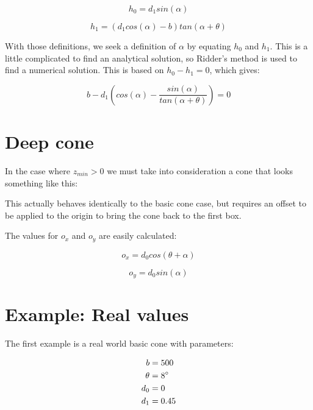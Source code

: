 \documentclass[12pt]{article}
\begin{document}
\begin{equation}
h_0 = d_1 sin(\alpha)
\end{equation}

\begin{equation}
h_1 = \left( d_1 cos(\alpha) - b \right) tan(\alpha + \theta)
\end{equation}

With those definitions, we seek a definition of $\alpha$ by equating
$h_0$ and $h_1$. This is a little complicated to find an analytical
solution, so Ridder's method is used to find a numerical solution. This
is based on $h_0 - h_1 = 0$, which gives:

\begin{equation}
b - d_1 \left( cos(\alpha) - \frac{sin(\alpha)}{tan(\alpha + \theta)} \right) = 0
\end{equation}

\section{Deep cone}

In the case where $z_{min} > 0$ we must take into consideration a cone that
looks something like this:

\resizebox{\textwidth}{!}{}

This actually behaves identically to the basic cone case, but requires an
offset to be applied to the origin to bring the cone back to the first
box.

\resizebox{\textwidth}{!}{}

The values for $o_x$ and $o_y$ are easily calculated:

\begin{equation}
o_x = d_0 cos(\theta + \alpha)
\end{equation}

\begin{equation}
o_y = d_0 sin(\alpha)
\end{equation}

\section{Example: Real values}

The first example is a real world basic cone with parameters:

\begin{equation}
\begin{split}
b &= 500 \\
\theta &= 8\degree \\
d_0 &= 0 \\
d_1 &= 0.45
\end{split}
\end{equation}
\end{document}

